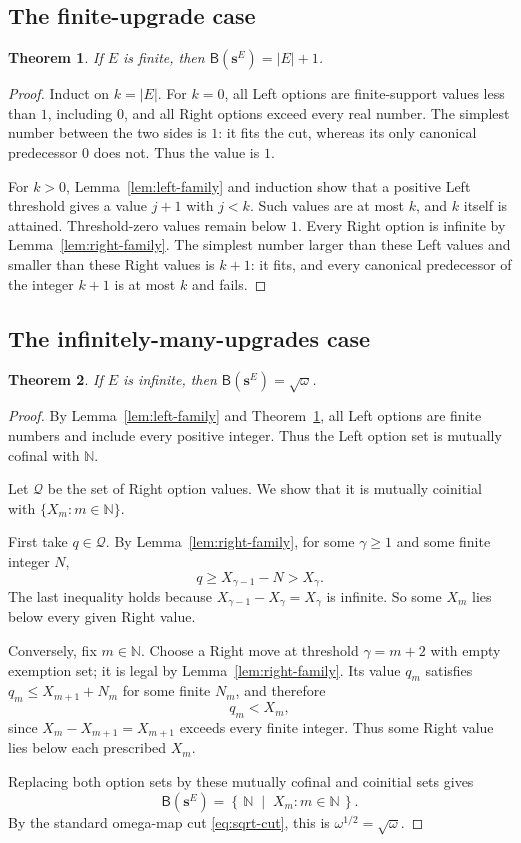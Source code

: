 \documentclass[11pt,letterpaper]{article}
\newtheorem{theorem}{Theorem}[section]
\theoremstyle{definition}
\theoremstyle{remark}
\newcommand{\NN}{\mathbb N}
\newcommand{\BB}{\mathsf B}
\newcommand{\bs}{\boldsymbol{s}}
\newcommand{\cut}[2]{\left\{\,#1\;\middle|\;#2\,\right\}}
\begin{document}
\subsection{The finite-upgrade case}

\begin{theorem}\label{thm:finite-E}
If $E$ is finite, then $\BB(\bs^E)=|E|+1$.
\end{theorem}
\begin{proof}
Induct on $k=|E|$. For $k=0$, all Left options are finite-support values less
than $1$, including $0$, and all Right options exceed every real number.
The simplest number between the two sides is $1$: it fits the cut, whereas its
only canonical predecessor $0$ does not. Thus the value is $1$.

For $k>0$, Lemma~\ref{lem:left-family} and induction show that a positive
Left threshold gives a value $j+1$ with $j<k$. Such values are at most $k$, and
$k$ itself is attained. Threshold-zero values remain below $1$. Every Right
option is infinite by Lemma~\ref{lem:right-family}. The simplest number larger
than these Left values and smaller than these Right values is $k+1$: it fits,
and every canonical predecessor of the integer $k+1$ is at most $k$ and fails.
\end{proof}

\subsection{The infinitely-many-upgrades case}

\begin{theorem}\label{thm:infinite-E}
If $E$ is infinite, then $\BB(\bs^E)=\sqrt{\omega}$.
\end{theorem}
\begin{proof}
By Lemma~\ref{lem:left-family} and Theorem~\ref{thm:finite-E}, all Left options
are finite numbers and include every positive integer. Thus the Left option set
is mutually cofinal with $\NN$.

Let $\mathcal Q$ be the set of Right option values. We show that it is mutually
coinitial with $\{X_m:m\in\NN\}$.

First take $q\in\mathcal Q$. By Lemma~\ref{lem:right-family}, for some
$\gamma\geq1$ and some finite integer $N$,
\[
                             q\geq X_{\gamma-1}-N>X_\gamma.
\]
The last inequality holds because $X_{\gamma-1}-X_\gamma=X_\gamma$ is infinite.
So some $X_m$ lies below every given Right value.

Conversely, fix $m\in\NN$. Choose a Right move at threshold $\gamma=m+2$ with
empty exemption set; it is legal by Lemma~\ref{lem:right-family}. Its value
$q_m$ satisfies $q_m\leq X_{m+1}+N_m$ for some finite $N_m$, and therefore
\[
                             q_m<X_m,
\]
since $X_m-X_{m+1}=X_{m+1}$ exceeds every finite integer. Thus some Right value
lies below each prescribed $X_m$.

Replacing both option sets by these mutually cofinal and coinitial sets gives
\[
                 \BB(\bs^E)=\cut{\NN}{X_m:m\in\NN}.
\]
By the standard omega-map cut \eqref{eq:sqrt-cut}, this is
$\omega^{1/2}=\sqrt{\omega}$.
\end{proof}
\end{document}
